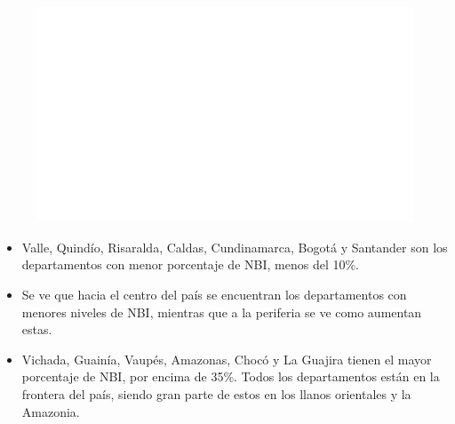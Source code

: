     \begin{figure}[H]
        \caption[Necesidades Básicas Insatisfechas por departamentos para el 2018 (mapa) ]{\label{nbi_dptos_mapa} }
        \begin{center}
        \includegraphics[width=\textwidth,keepaspectratio]{img/var_273_map.png}
        \end{center}
    \end{figure}
            \begin{itemize}
                    \item Valle, Quindío, Risaralda, Caldas, Cundinamarca, Bogotá y Santander son los departamentos con menor porcentaje de NBI, menos del 10\%.
                    \item Se ve que hacia el centro del país se encuentran los departamentos con menores niveles de NBI, mientras que a la periferia se ve como aumentan estas.
                    \item Vichada, Guainía, Vaupés, Amazonas, Chocó y La Guajira tienen el mayor porcentaje de NBI, por encima de 35\%. Todos los departamentos están en la frontera del país, siendo gran parte de estos en los llanos orientales y la Amazonia.
                    \end{itemize}

